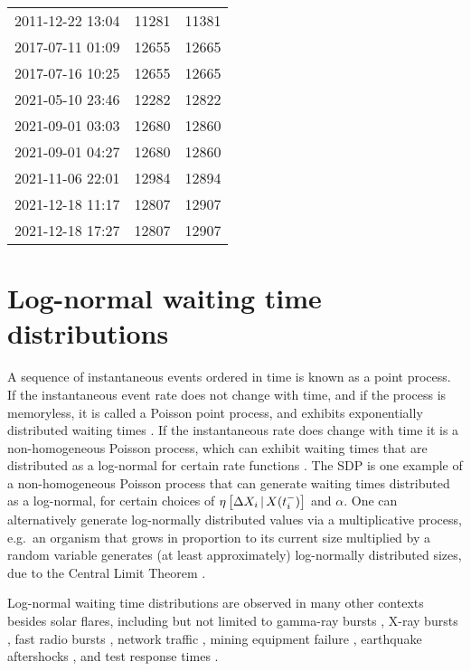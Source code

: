 \begin{subappendices}
\begin{table}
{\begin{tabular}{l p{3.3cm} p{3.3cm}}
2011-12-22 13:04 & 11281 & 11381 \\
2017-07-11 01:09 & 12655 & 12665 \\
2017-07-16 10:25 & 12655 & 12665 \\
2021-05-10 23:46 & 12282 & 12822 \\
2021-09-01 03:03 & 12680 & 12860 \\
2021-09-01 04:27 & 12680 & 12860 \\
2021-11-06 22:01 & 12984 & 12894 \\
2021-12-18 11:17 & 12807 & 12907 \\
2021-12-18 17:27 & 12807 & 12907 \\
\bottomrule
\end{tabular}
}
\end{table}

\section{Log-normal waiting time distributions} \label{app:sf_ln}
A sequence of instantaneous events ordered in time is known as a point process. If the instantaneous event rate does not change with time, and if the process is memoryless, it is called a Poisson point process, and exhibits exponentially distributed waiting times \citep{Kingman1993}. If the instantaneous rate does change with time it is a non-homogeneous Poisson process, which can exhibit waiting times that are distributed as a log-normal for certain rate functions \citep{Gardiner2009,Last2017}. The SDP is one example of a non-homogeneous Poisson process that can generate waiting times distributed as a log-normal, for certain choices of $\eta\left[\Delta X_{i}\,|\,X(t_i^-)\right]$ and $\alpha$. One can alternatively generate log-normally distributed values via a multiplicative process, e.g.~an organism that grows in proportion to its current size multiplied by a random variable generates (at least approximately) log-normally distributed sizes, due to the Central Limit Theorem \citep{Mitzenmacher2003}. 

Log-normal waiting time distributions are observed in many other contexts besides solar flares, including but not limited to gamma-ray bursts \citep{Li1996}, X-ray bursts \citep{Gogus1999,Gogus2000,Gavriil2004}, fast radio bursts \citep{Gourdji2019}, network traffic \citep{Paxson1994,Singhai2007}, mining equipment failure \citep{LaRoche-Carrier2019}, earthquake aftershocks \citep{Peng2009}, and test response times \citep{VanDerLinden2006}.


\end{subappendices}
